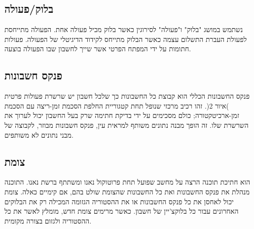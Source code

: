 \begin{figure}[!b]
{
 }
      \label{fig:account_chain}
      
\end{figure}

\subsection{בלוק/פעולה}
נשתמש במושג "בלוק" ו"פעולה" לסירוגין כאשר בלוק מכיל פעולה אחת. הפעולה מתייחסת לפעולת העברת התשלום עצמה כאשר הבלוק מתייחס לקידוד הדיגיטלי של הפעולה. פעולות חתומות על ידי המפתח הפרטי אשר שייך לחשבון שבו הפעולה בוצעה.

\subsection{פנקס חשבונות}
פנקס החשבונות הכללי הוא קבוצת כל החשבונות כך שלכל חשבון יש שרשרת פעולות פרטית )איור 2(. זהו רכיב מרכזי שנופל תחת  קטגוריית החלפת הסכמת זמן-ריצה עם הסכמת זמן-ארכיטקטורה; כולם מסכימים על ידי בדיקת חתימה שרק בעל החשבון יכול לערוך את השרשרת שלו. זה הופך מבנה נתונים משותף למראית עין, פנקס חשבונות מבוזר, לקבוצה של מבני נתונים לא משותפים.

\subsection{צומת}
הוא חתיכת תוכנה הרצה על מחשב שפועל תחת פרוטוקול נאנו ומשתתף ברשת נאנו. התוכנה מנהלת את פנקס החשבונות ואת כל החשבונות שהצומת שולט בהם, אם קימיים כאלה. צומת יכול לאחסן את כל פנקס החשבונות או את ההסטוריה הגזומה המכילה רק את הבלוקים האחרונים עבור כל בלוקצ'יין של חשבון. כאשר מרימים צומת חדש, מומלץ לאשר את כל ההסטוריה ולגזום בצורה מקומית.